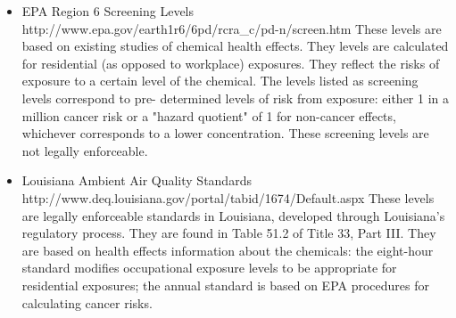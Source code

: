 \documentclass{article}
\begin{document}
\begin{itemize}
\item EPA Region 6 Screening Levels\newline
http://www.epa.gov/earth1r6/6pd/rcra\_c/pd-n/screen.htm\newline
These levels are based on existing studies of chemical health effects.
They levels are calculated for residential (as opposed to workplace)
exposures. They reflect the risks of exposure to a certain level of the
chemical. The levels listed as screening levels correspond to pre-
determined levels of risk from exposure: either 1 in a million cancer risk
or a "hazard quotient" of 1 for non-cancer effects, whichever
corresponds to a lower concentration. These screening levels are not
legally enforceable.

\item Louisiana Ambient Air Quality Standards\newline
http://www.deq.louisiana.gov/portal/tabid/1674/Default.aspx\newline
These levels are legally enforceable standards in Louisiana, developed
through Louisiana's regulatory process. They are found in Table 51.2 of
Title 33, Part III.
They are based on health effects information about the chemicals: the
eight-hour standard modifies occupational exposure levels to be
appropriate for residential exposures; the annual standard is based on
EPA procedures for calculating cancer risks.
\end{itemize}
\end{document}
